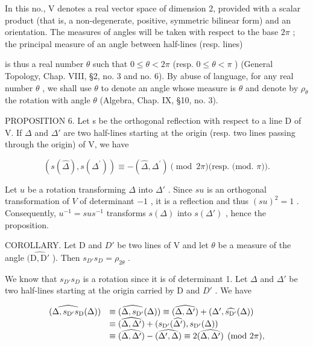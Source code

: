 In this no., V denotes a real vector space of dimension 2, provided with a scalar product (that is, a non-degenerate, positive, symmetric bilinear form) and an orientation. The measures of angles will be taken with respect to the base \(2\pi\) ; the principal measure of an angle between half-lines (resp. lines)

is thus a real number \(\theta\) such that \(0 \leqslant \theta < 2\pi\) (resp. \(0 \leqslant \theta < \pi\) ) (General Topology, Chap. VIII, §2, no. 3 and no. 6). By abuse of language, for any real number \(\theta\) , we shall use \(\theta\) to denote an angle whose measure is \(\theta\) and denote by \(\rho_{\theta}\) the rotation with angle \(\theta\) (Algebra, Chap. IX, §10, no. 3).

PROPOSITION 6. Let s be the orthogonal reflection with respect to a line D of V. If \(\Delta\) and \(\Delta'\) are two half-lines starting at the origin (resp. two lines passing through the origin) of V, we have

\[
(s (\widehat {\Delta}), s (\Delta^ {\prime})) \equiv - (\widehat {\Delta}, \Delta^ {\prime}) \pmod {2 \pi} \text {(resp. (mod. } \pi \text {))}.
\]

Let \(u\) be a rotation transforming \(\Delta\) into \(\Delta'\) . Since \(su\) is an orthogonal transformation of \(V\) of determinant \(-1\) , it is a reflection and thus \((su)^2 = 1\) . Consequently, \(u^{-1} = sus^{-1}\) transforms \(s(\Delta)\) into \(s(\Delta')\) , hence the proposition.

COROLLARY. Let D and \(D'\) be two lines of V and let \(\theta\) be a measure of the angle \((\widehat{\mathrm{D},\mathrm{D}'}\) ). Then \(s_{D'}s_{D} = \rho_{2\theta}\) .

We know that \(s_{D'} s_{D}\) is a rotation since it is of determinant 1. Let \(\Delta\) and \(\Delta'\) be two half-lines starting at the origin carried by D and \(D'\) . We have

\[
\begin{array}{r l} (\widehat {\Delta , s _ {\mathrm {D^ {\prime}}} s _ {\mathrm{D}}} (\Delta)) & \equiv (\widehat {\Delta , s _ {\mathrm {D^ {\prime}}}} (\Delta)) \equiv (\widehat {\Delta , \Delta^ {\prime}}) + (\Delta^ {\prime}, \widehat {s _ {\mathrm {D^ {\prime}}}} (\Delta)) \\ & \equiv (\widehat {\Delta , \Delta^ {\prime}}) + (s _ {\mathrm {D^ {\prime}}} (\widehat {\Delta^ {\prime}}), s _ {\mathrm {D^ {\prime}}} (\Delta)) \\ & \equiv (\widehat {\Delta , \Delta^ {\prime}}) - (\widehat {\Delta^ {\prime} , \Delta}) \equiv 2 (\widehat {\Delta , \Delta^ {\prime}}) \pmod {2 \pi}, \end{array}
\]

